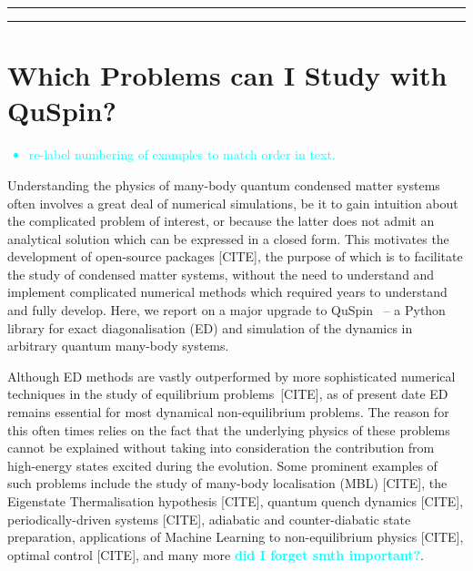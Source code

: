 \documentclass{SciPost}
\newcommand\0{\scalebox{-1}[1]{0}}
\newcommand*{\cyan}{\textcolor{cyan}}
\begin{document}
\vspace{10pt}
\noindent\rule{\textwidth}{1pt}
\tableofcontents\thispagestyle{fancy}
\noindent\rule{\textwidth}{1pt}
\vspace{10pt}


\section{Which Problems can I Study with QuSpin?}
\label{sec:intro}

\cyan{
\begin{itemize}
	\item re-label numbering of examples to match order in text.
\end{itemize}
	}

Understanding the physics of many-body quantum condensed matter systems often involves a great deal of numerical simulations, be it to gain intuition about the complicated problem of interest, or because the latter does not admit an analytical solution which can be expressed in a closed form. This motivates the development of open-source packages [CITE], the purpose of which is to facilitate the study of condensed matter systems, without the need to understand and implement complicated numerical methods which required years to understand and fully develop. Here, we report on a major upgrade to QuSpin~\cite{weinberg_17_quspin} -- a Python library for exact diagonalisation (ED) and simulation of the dynamics in arbitrary quantum many-body systems. 

Although ED methods are vastly outperformed by more sophisticated numerical techniques in the study of equilibrium problems~[CITE], as of present date ED remains essential for most dynamical non-equilibrium problems. The reason for this often times relies on the fact that the underlying physics of these problems cannot be explained without taking into consideration the contribution from high-energy states excited during the evolution. Some prominent examples of such problems include the study of many-body localisation (MBL) [CITE], the Eigenstate Thermalisation hypothesis [CITE], quantum quench dynamics [CITE], periodically-driven systems [CITE], adiabatic and counter-diabatic state preparation, applications of Machine Learning to non-equilibrium physics [CITE], optimal control [CITE], and many more \cyan{\bf did I forget smth important?}.
\end{document}
